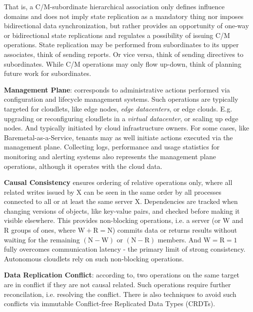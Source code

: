 \documentclass[conference]{IEEEtran}
\begin{document}
That is, a C/M-subordinate hierarchical association only defines influence
domains and does not imply state replication as a mandatory thing nor imposes
bidirectional data synchronization, but rather provides an opportunity of
one-way or bidirectional state replications and regulates a possibility of
issuing C/M operations. State replication may be performed from subordinates to
its upper associates, think of sending reports. Or vice versa, think of sending
directives to subordinates. While C/M operations may only flow up-down, think
of planning future work for subordinates.

\textbf{Management Plane}: corresponds to administrative actions performed via
configuration and lifecycle management systems. Such operations are typically
targeted for cloudlets, like edge nodes, \textit{edge datacenters}\cite{b3},
or edge clouds. E.g. upgrading or reconfiguring cloudlets in a \textit{virtual
datacenter}\cite{b3}, or scaling up edge nodes. And typically initiated by
cloud infrastructure owners. For some cases, like Baremetal-as-a-Service,
tenants may as well initiate actions executed via the management plane.
Collecting logs, performance and usage statistics for monitoring and alerting
systems also represents the management plane operations, although it operates
with the cloud data.

\textbf{Causal Consistency}\cite{b6} ensures ordering of relative operations
only, where all related writes issued by $\mathrm{X}$ can be seen in the same
order by all processes connected to all or at least the same server
$\mathrm{X}$. Dependencies are tracked when changing versions of objects, like
key-value pairs, and checked before making it visible elsewhere. This provides
non-blocking operations, i.e. a server (or $\mathrm{W}$ and $\mathrm{R}$ groups
of ones, where $\mathrm{W + R = N}$) commits data or returns results without
waiting for the remaining $\mathrm{(N - W)}$ or $\mathrm{(N - R)}$ members. And
$\mathrm{W = R = 1}$ fully overcomes communication latency - the primary limit
of strong consistency. Autonomous cloudlets rely on such non-blocking
operations.

\textbf{Data Replication Conflict}: according to\cite{b1}, two operations on
the same target are in conflict if they are not causal related. Such
operations require further reconcilation, i.e. resolving the conflict. There is
also techniques to avoid such conflicts via immutable Conflict-free Replicated
Data Types (CRDTs).
\end{document}
